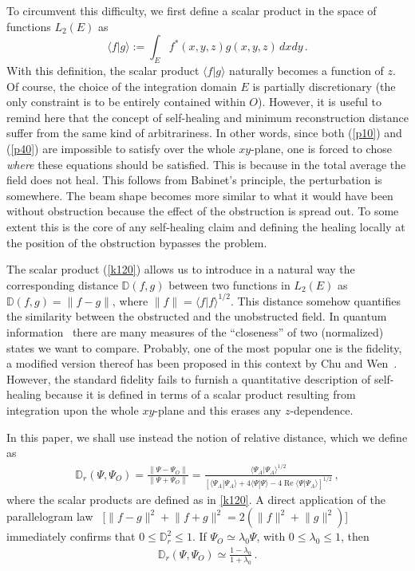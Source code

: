 \documentclass[10pt]{article}
\newcommand{\re}{\operatorname{Re}}
\providecommand{\norm}[1]{\lVert#1\rVert}
\begin{document}
To circumvent this difficulty, we first define a scalar product in
the space of functions $L_2(E)$ as
\begin{equation}
  \label{k120}
  \langle f | g \rangle := \int_{E} f^{\ast} (x,y,z) g(x,y,z)  \, 
  dx  dy \, .
\end{equation}
With this definition, the scalar product $\langle f | g \rangle $ naturally
becomes a function of $z$. Of course, the choice of the integration
domain $E$ is partially discretionary (the only constraint is to be entirely
contained within $O$). However, it is useful to remind here that the
concept of self-healing and minimum reconstruction distance
suffer from the same kind of arbitrariness. In other words, since both
(\ref{p10}) and (\ref{p40}) are impossible to satisfy over the whole
$xy$-plane, one is forced to chose \emph{where} these equations should
be satisfied.  This is because in the total average the field does not
heal.  This follows from Babinet's principle, the perturbation is
somewhere. The beam shape becomes more similar to what it would have
been without obstruction because the effect of the obstruction is
spread out. To some extent this is the core of any self-healing claim
and  defining the healing locally at the position of the obstruction
bypasses the problem.

The scalar product (\ref{k120}) allows us to introduce in a natural
way the corresponding distance $\mathbb{D}(f,g)$ between two functions
in $L_2(E)$ as $\mathbb{D} (f,g) = \norm{f -g}$, where
$\norm{f} = \langle f | f \rangle^{1/2}$.  This distance somehow
quantifies the similarity between the obstructed and the unobstructed
field. In quantum information~\cite{Nielsen:2000aa} there are many
measures of the ``closeness'' of two (normalized) states we want to
compare. Probably, one of the most popular one is the fidelity, a
modified version thereof has been proposed in this context by Chu and
Wen~\cite{Chu:2014aa}. However, the standard fidelity fails to furnish
a quantitative description of self-healing because it is
defined in terms of a scalar product resulting from integration upon
the whole $xy$-plane and this erases any $z$-dependence.

In this paper, we shall use instead the notion of relative distance, which
we define as
\begin{align}
\label{mtpm}
 \mathbb{D}_r(\Psi,\Psi_O)  = 
 \frac{\| \Psi-\Psi_O \|}{\| \Psi+\Psi_O \|} 
  = \frac{\langle \Psi_A | \Psi_A \rangle^{1/2}}
 {\left [\langle \Psi_A | \Psi_A \rangle  +  4 \langle \Psi | \Psi
  \rangle  -  4 \re \langle \Psi | \Psi_A \rangle \right  ]^{1/2}} \, ,
\end{align}
where the scalar products are defined as in \eqref{k120}. 
A direct application of the parallelogram law~\cite{Kolmogorov:1999aa}
[$\norm{f-g}^{2} + \norm{f+g}^{2} = 2(\norm{f}^{2} + \norm{g}^{2})$]
immediately confirms that $0 \le \mathbb{D}_{r}^{2} \le 1$.  If $\Psi_O
\simeq \lambda_0 \Psi$,  with $0 \leq \lambda_0 \leq 1$, then
\begin{align}
\mathbb{D}_r(\Psi,\Psi_O) \simeq  
\frac{1 - \lambda_0}{1+ \lambda_0} \, .
\end{align}
\end{document}
